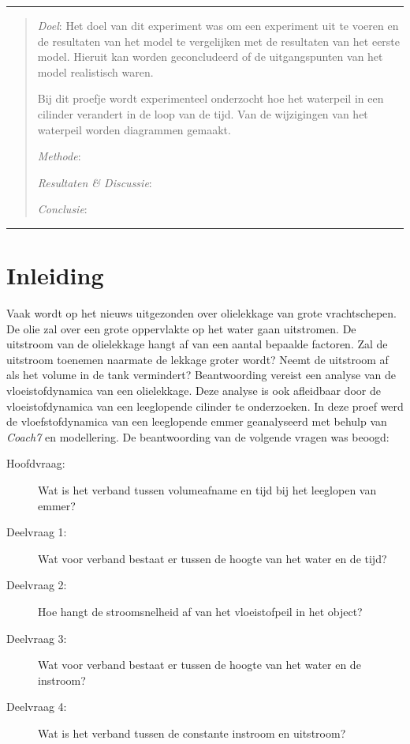 \documentclass[numbers=endperiod]{scrartcl}
\begin{document}

\hrule
\begin{abstract}
    \textit{Doel}: Het doel van dit experiment was om een experiment uit te voeren en de resultaten van het model te vergelijken met de resultaten van het eerste model. Hieruit kan worden geconcludeerd of de uitgangspunten van het model realistisch waren.
    
    Bij dit proefje wordt experimenteel onderzocht hoe het waterpeil in een cilinder verandert in de loop van de tijd. Van de wijzigingen van het waterpeil worden diagrammen gemaakt.  

    \textit{Methode}:

    \textit{Resultaten \& Discussie}:

    \textit{Conclusie}:
\end{abstract}
\hrule
\newpage
\section{Inleiding}
Vaak wordt op het nieuws uitgezonden over olielekkage van grote vrachtschepen. De olie zal over een grote oppervlakte op het water gaan uitstromen. De uitstroom van de olielekkage hangt af van een aantal bepaalde factoren. Zal de uitstroom toenemen naarmate de lekkage groter wordt? Neemt de uitstroom af als het volume in de tank vermindert? Beantwoording vereist een analyse van de vloeistofdynamica van een olielekkage. Deze analyse is ook afleidbaar door de vloeistofdynamica van een leeglopende cilinder te onderzoeken. In deze proef werd de vloefstofdynamica van een leeglopende emmer geanalyseerd met behulp van \textit{Coach7} en modellering. De beantwoording van de volgende vragen was beoogd:

\begin{description}
\item[Hoofdvraag:] Wat is het verband tussen volumeafname en tijd bij het leeglopen van emmer?

\item[Deelvraag 1:] Wat voor verband bestaat er tussen de hoogte van het water en de tijd?

\item[Deelvraag 2:] Hoe hangt de stroomsnelheid af van het vloeistofpeil in het object?

\item[Deelvraag 3:] Wat voor verband bestaat er tussen de hoogte van het water en de instroom?

\item[Deelvraag 4:] Wat is het verband tussen de constante instroom en uitstroom?
\end{description}
\end{document}
